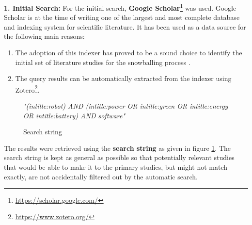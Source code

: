\vspace{5mm}

\noindent\textbf{1. Initial Search:}
For the initial search, \textbf{Google Scholar}\footnote{\url{https://scholar.google.com/}} was used. 
Google Scholar is at the time of writing one of the largest and most complete database and indexing system for scientific literature.
It has been used as a data source for the following main reasons:
\begin{enumerate}
    \item The adoption of this indexer has proved to be a sound choice to identify the initial set 
    of literature studies for the snowballing process \cite{wohlin2014snowballing}.
    \item The query results can be automatically extracted from the indexer using Zotero\footnote{\url{https://www.zotero.org/}}.
\end{enumerate}

\begin{figure}
    \centering
    \textit{"(intitle:robot) AND (intitle:power OR intitle:green OR intitle:energy OR intitle:battery) AND software"}
    \caption{Search string}
    \label{fig:search_string}
\end{figure}

The results were retrieved using the \textbf{search string} as given in figure \ref{fig:search_string}. 
The search string is kept as general as possible so that potentially relevant studies that would be able to make it 
to the primary studies, but might not match exactly, are not accidentally filtered out by the automatic search.

